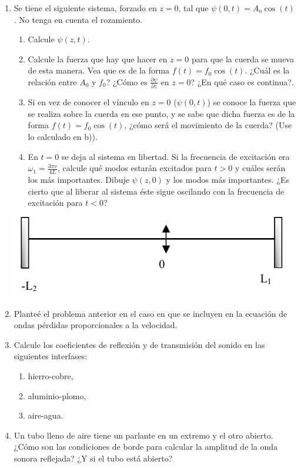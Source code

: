 \documentclass[11pt,spanish,a4paper]{article}
\begin{document}
\begin{enumerate}
\item Se tiene el siguiente sistema, forzado en \(z=0\), tal que \(\psi(0,t)= A_o \cos{(t)}\).
	No tenga en cuenta el rozamiento.
	\begin{enumerate}
		\item Calcule \(\psi(z,t)\).
		\item Calcule la fuerza que hay que hacer en \(z=0\) para que la cuerda se mueva de esta manera.
			Vea que es de la forma \(f(t)= f_0 \cos{(t)}\).
			¿Cuál es la relación entre \(A_0\) y \(f_0\)?
			¿Cómo es \(\frac{\partial \psi}{\partial z}\) en \(z=0\)?
			¿En qué caso es continua?.
		\item Si en vez de conocer el vínculo en \(z=0\) (\(\psi(0,t)\)) se conoce la fuerza que se realiza sobre la cuerda en ese punto, y se sabe que dicha fuerza es de la forma \(f(t)= f_0 \cos{(t)}\), ¿cómo será el movimiento de la cuerda? (Use lo calculado en b)).
		\item En \(t=0\) se deja al sistema en libertad.
			Si la frecuencia de excitación era \(\omega_1= \frac{3 \pi v}{4 L}\), calcule qué modos estarán excitados para \(t>0\) y cuáles serán los más importantes.
			Dibuje \(\psi(z,0)\) y los modos más importantes.
			¿Es cierto que al liberar al sistema éste sigue oscilando con la frecuencia de excitación para \(t<0\)?
	\end{enumerate}
\begin{center}
	\includegraphics[width=0.45\linewidth]{g05e09}
\end{center}


\item Planteé el problema anterior en el caso en que se incluyen en la ecuación de ondas pérdidas
proporcionales a la velocidad.


\item Calcule los coeficientes de reflexión y de transmisión del sonido en las siguientes interfases:
	\begin{enumerate}
		\item hierro-cobre, 
		\item aluminio-plomo,
		\item aire-agua.
	\end{enumerate}


\item Un tubo lleno de aire tiene un parlante en un extremo y el otro abierto.
	¿Cómo son las condiciones de borde para calcular la amplitud de la onda sonora reflejada?
	¿Y si el tubo está abierto?


\end{enumerate}
\end{document}
